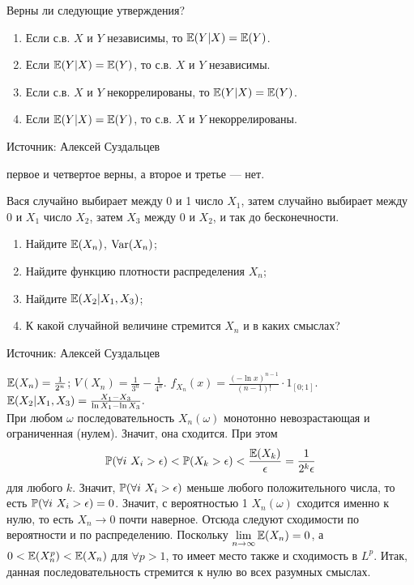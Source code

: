 \begin{solution}
\begin{solution}
\begin{solution}
\begin{solution}
\begin{solution}
\begin{solution}
\begin{solution}
\begin{solution}
\end{solution}

\begin{problem}
Верны ли следующие утверждения?
\begin{enumerate}
  \item Если с.в. $X$ и $Y$ независимы, то $\E(Y|X)=\E(Y)$.
  \item Если $\E(Y|X)=\E(Y)$, то с.в. $X$ и $Y$ независимы.
  \item Если с.в. $X$ и $Y$ некоррелированы, то $\E(Y|X)=\E(Y)$.
  \item Если $\E(Y|X)=\E(Y)$, то с.в. $X$ и $Y$ некоррелированы.
\end{enumerate}

Источник: Алексей Суздальцев
\end{problem} 
\begin{solution} 
 первое и четвертое верны, а второе и третье --- нет.
\end{solution}

\begin{problem}
 Вася случайно выбирает между 0 и 1 число $X_1$, затем случайно выбирает между 0 и $X_1$ число $X_2$, затем $X_3$ между 0 и $X_{2}$, и так до бесконечности.
\begin{enumerate}
  \item Найдите $\E(X_n)$, $\Var(X_n)$;
  \item Найдите функцию плотности распределения $X_n$;
  \item Найдите $\E(X_2|X_1,X_3)$;
\item К какой случайной величине стремится $X_n$ и в каких смыслах?
\end{enumerate}

Источник: Алексей Суздальцев
\end{problem} 
\begin{solution} 

$\E(X_n)=\frac{1}{2^n}$; $V(X_n)=\frac{1}{3^n}-\frac{1}{4^n}$. $f_{X_n}(x)=\frac{(-\ln{x})^{n-1}}{(n-1)!}\cdot 1_{[0;1]}.$\\
$\E(X_2|X_1,X_3)=\frac{X_1-X_3}{\ln{X_1}-\ln{X_3}}.$\\
При любом $\omega$ последовательность $X_n(\omega)$ монотонно невозрастающая и ограниченная (нулем). Значит, она сходится. При этом
\[
 \P(\forall i \mbox{ } X_i>\epsilon)<\P(X_k>\epsilon)<\frac{\E(X_k)}{\epsilon}=\frac{1}{2^k\epsilon}
 \] 
 для любого $k$. Значит, $\P(\forall i \mbox{ }X_i>\epsilon)$ меньше любого положительного числа, то есть $\P(\forall i\mbox{ }X_i>\epsilon)=0$. Значит, с вероятностью 1 $X_n(\omega)$ сходится именно к нулю, то есть $X_n\to 0$ почти наверное. Отсюда следуют сходимости по вероятности и по распределению. Поскольку $\lim\limits_{n\to \infty}\E(X_n)=0$, а $0<\E(X_n^p)<\E(X_n)$ для $\forall p>1$, то имеет место также и сходимость в $L^p$. Итак, данная последовательность стремится к нулю во всех разумных смыслах.
\end{solution}


\end{solution}
\end{solution}
\end{solution}
\end{solution}
\end{solution}
\end{solution}
\end{solution}
